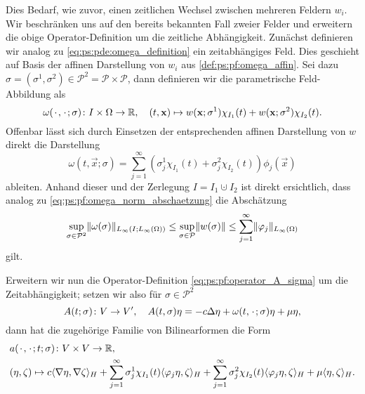 Dies Bedarf, wie zuvor, einen zeitlichen Wechsel zwischen mehreren Feldern $w_{i}$.
Wir beschränken uns auf den bereits bekannten Fall zweier Felder und erweitern die obige Operator-Definition um die zeitliche Abhängigkeit.
Zunächst definieren wir analog zu \cref{eq:ps:pde:omega_definition} ein zeitabhängiges Feld.
Dies geschieht auf Basis der affinen Darstellung von $w_{i}$ aus \cref{def:ps:pf:omega_affin}.
Sei dazu $\sigma = (\sigma^{1}, \sigma^{2}) \in \mathcal P^{2} =  \mathcal P \times \mathcal P$, dann definieren wir die parametrische Feld-Abbildung als
\begin{equation}
\label{eq:ps:pde:omega_definition_affin}
    \omega({\mkern2mu\cdot\mkern2mu}, {\mkern2mu\cdot\mkern2mu}; \sigma) \colon I \times \Omega \to \mathbb{R}, \quad (t, \mathbf{x}) \mapsto
    w(\mathbf{x}; \sigma^{1}) \chi_{I_{1}}(t) + w(\mathbf{x}; \sigma^{2}) \chi_{I_{2}}(t).
\end{equation}
Offenbar lässt sich durch Einsetzen der entsprechenden affinen Darstellung von $w$ direkt die Darstellung
\begin{equation}
    \omega(t, \vec{x}; \sigma) = \sum_{j = 1}^{\infty} (\sigma^{1}_{j} \chi_{I_{1}}(t) + \sigma^{2}_{j} \chi_{I_{2}}(t)) \phi_{j}(\vec x)
\end{equation}
ableiten.
Anhand dieser und der Zerlegung $I = I_{1} \cupdot I_{2}$ ist direkt ersichtlich, dass analog zu \cref{eq:ps:pf:omega_norm_abschaetzung} die Abschätzung
\begin{equation}
    \sup_{\sigma \in \mathcal P^{2}} \lVert\omega(\sigma)\rVert_{L_{\infty}(I; L_{\infty}(\Omega))} \leq \sup_{\sigma \in \mathcal P} \lVert w(\sigma)\rVert \leq \sum_{j = 1}^{\infty} \lVert\varphi_{j}\rVert_{L_{\infty}(\Omega)}
\end{equation}
gilt.

Erweitern wir nun die Operator-Definition \cref{eq:ps:pf:operator_A_sigma} um die Zeitabhängigkeit; setzen wir also für $\sigma \in \mathcal P^{2}$
\begin{equation}
    \label{eq:ps:pf:operator_A_sigma_zeit}
    A(t; \sigma) \colon V \to V', \quad A(t, \sigma) \eta = -c \Delta \eta + \omega(t, {\mkern2mu\cdot\mkern2mu}; \sigma) \eta + \mu \eta,
\end{equation}
dann hat die zugehörige Familie von Bilinearformen die Form
\begin{equation}
    \label{eq:ps:pf:bilineaform_a_sigma_zeit}
    \begin{aligned}
        &a({\mkern2mu\cdot\mkern2mu}, {\mkern2mu\cdot\mkern2mu}; t; \sigma) \colon V \times V \to \mathbb{R}, \\
        &(\eta, \zeta) \mapsto c\langle\nabla \eta,\nabla \zeta\rangle_{H} + \sum_{j = 1}^{\infty} \sigma^{1}_{j} \chi_{I_{1}}(t) \langle\varphi_{j} \eta,\zeta\rangle_{H} + \sum_{j = 1}^{\infty} \sigma^{2}_{j} \chi_{I_{2}}(t) \langle\varphi_{j} \eta,\zeta\rangle_{H} + \mu \langle\eta,\zeta\rangle_{H}.
    \end{aligned}
\end{equation}

